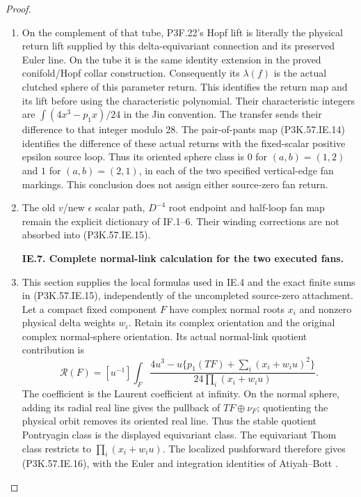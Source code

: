 \begin{proof}
\begin{enumerate}[label=\arabic*.]
\item On the complement of that tube, P3F.22's Hopf lift
is literally the physical return lift supplied by
this delta-equivariant connection and its preserved
Euler line. On the tube it is the same identity
extension in the proved conifold/Hopf collar
construction. Consequently its \(\lambda(f)\) is
the actual clutched sphere of this parameter return.
This identifies the return map and its lift before
using the characteristic polynomial. Their
characteristic integers are
\(\int(4x^3-p_1x)/24\) in the Jin convention.
The transfer sends their difference to that integer
modulo 28. The pair-of-pants map (P3K.57.IE.14) identifies
the difference of these actual returns with the
fixed-scalar positive epsilon source loop. Thus
its oriented sphere class is \(0\) for \((a,b)=(1,2)\)
and \(1\) for \((a,b)=(2,1)\), in each of the two
specified vertical-edge fan markings. This conclusion
does not assign either source-zero fan return.

\item The old
\(v\)/new \(\epsilon\) scalar path,
\(D^{-4}\) root endpoint and
half-loop fan map remain the explicit
dictionary of IF.1--6. Their winding
corrections are not absorbed into
(P3K.57.IE.15).

\par\medskip\noindent\textbf{IE.7. Complete normal-link calculation for the two executed fans.}\par\nopagebreak[4]

\item This section supplies the local formulas used in IE.4 and
the exact finite sums in (P3K.57.IE.15), independently of the
uncompleted source-zero attachment. Let a compact fixed
component \(F\) have complex normal roots \(x_i\) and
nonzero physical delta weights \(w_i\). Retain its complex
orientation and the original complex normal-sphere
orientation. Its actual normal-link quotient contribution is
\[
 \mathcal R(F)=[u^{-1}]\int_F
 \frac{4u^3-u\{p_1(TF)+\sum_i(x_i+w_i u)^2\}}
      {24\prod_i(x_i+w_i u)}.                         \tag{P3K.57.IE.16}
\]
The coefficient is the Laurent coefficient at infinity.
On the normal sphere, adding its radial real line gives
the pullback of \(TF\oplus\nu_F\); quotienting the
physical orbit removes its oriented real line. Thus the
stable quotient Pontryagin class is the displayed
equivariant class. The equivariant Thom class restricts
to \(\prod_i(x_i+w_i u)\). The localized pushforward
therefore gives (P3K.57.IE.16), with the Euler and integration
identities of Atiyah--Bott \cite[pp.~8--9, Theorem~(3.5), equations~(3.7)--(3.8)]{AtiyahBott1984}.


\end{enumerate}
\end{proof}
